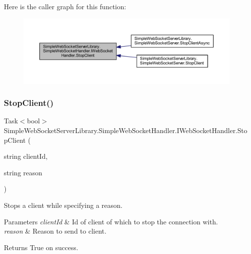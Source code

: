 Here is the caller graph for this function\+:
\nopagebreak
\begin{figure}[H]
\begin{center}
\leavevmode
\includegraphics[width=350pt]{interface_simple_web_socket_server_library_1_1_simple_web_socket_handler_1_1_i_web_socket_handler_a38b3104f285279f6fd3101765b2f0076_icgraph}
\end{center}
\end{figure}
\mbox{\label{interface_simple_web_socket_server_library_1_1_simple_web_socket_handler_1_1_i_web_socket_handler_ae8b12d5764a614d7827c51cdb086bee0}} 
\subsubsection{\texorpdfstring{Stop\+Client()}{StopClient()}\hspace{0.1cm}{\footnotesize\ttfamily [2/2]}}
{\footnotesize\ttfamily Task$<$bool$>$ Simple\+Web\+Socket\+Server\+Library.\+Simple\+Web\+Socket\+Handler.\+I\+Web\+Socket\+Handler.\+Stop\+Client (\begin{DoxyParamCaption}\item[{string}]{client\+Id,  }\item[{string}]{reason }\end{DoxyParamCaption})}



Stops a client while specifying a reason. 


\begin{DoxyParams}{Parameters}
{\em client\+Id} & Id of client of which to stop the connection with.\\
\hline
{\em reason} & Reason to send to client.\\
\hline
\end{DoxyParams}
\begin{DoxyReturn}{Returns}
True on success.
\end{DoxyReturn}


